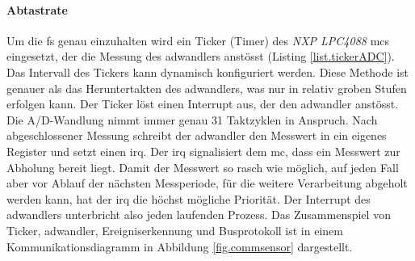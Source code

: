 \paragraph{Abtastrate} Um die \gls{fs} genau einzuhalten wird ein Ticker (Timer) des \emph{NXP LPC4088} \gls{mc}s eingesetzt, der die Messung des \gls{adwandler}s anstösst (Listing \ref{list.tickerADC}). Das Intervall des Tickers kann dynamisch konfiguriert werden. Diese Methode ist genauer als das Heruntertakten des \gls{adwandler}s, was nur in relativ groben Stufen erfolgen kann. Der Ticker löst einen Interrupt aus, der den \gls{adwandler} anstösst. Die A/D-Wandlung nimmt immer genau 31 Taktzyklen in Anspruch. Nach abgeschlossener Messung schreibt der \gls{adwandler} den Messwert in ein eigenes Register und setzt einen \gls{irq}. Der \gls{irq} signalisiert dem \gls{mc}, dass ein Messwert zur Abholung bereit liegt. Damit der Messwert so rasch wie möglich, auf jeden Fall aber vor Ablauf der nächsten Messperiode, für die weitere Verarbeitung abgeholt werden kann, hat der \gls{irq} die höchst mögliche Priorität. Der Interrupt des \gls{adwandler}s unterbricht also jeden laufenden Prozess. Das Zusammenspiel von Ticker,  \gls{adwandler}, Ereigniserkennung und Busprotokoll ist in einem Kommunikationsdiagramm in Abbildung \ref{fig.commsensor} dargestellt.

